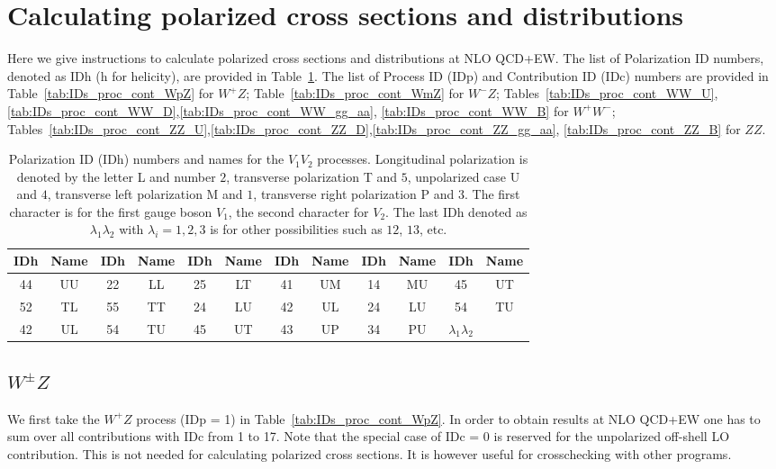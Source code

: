 \documentclass[english,12pt]{article}
\newcommand{\tab}[1]{Table~\ref{#1}}
\begin{document}
\section{Calculating polarized cross sections and distributions}
\label{sec:cal_pol_xs}
Here we give instructions to calculate polarized cross sections and distributions at NLO QCD+EW.
The list of Polarization ID numbers, denoted as IDh (h for helicity), are provided in \tab{tab:IDs_polars}. 
The list of Process ID (IDp) and Contribution ID (IDc) numbers are provided in 
\tab{tab:IDs_proc_cont_WpZ} for $W^+Z$; 
\tab{tab:IDs_proc_cont_WmZ} for $W^-Z$;
Tables~\ref{tab:IDs_proc_cont_WW_U},\ref{tab:IDs_proc_cont_WW_D},\ref{tab:IDs_proc_cont_WW_gg_aa}, 
\ref{tab:IDs_proc_cont_WW_B} for $W^+W^-$;
Tables~\ref{tab:IDs_proc_cont_ZZ_U},\ref{tab:IDs_proc_cont_ZZ_D},\ref{tab:IDs_proc_cont_ZZ_gg_aa}, 
\ref{tab:IDs_proc_cont_ZZ_B} for $ZZ$.
\begin{table}[th!]
\begin{center}
\begin{tabular}{|cc|cc|cc|cc|cc|cc|}\hline
IDh  & Name & IDh & Name & IDh & Name & IDh & Name & IDh & Name & IDh & Name \\
\hline
44 & UU & 22 & LL & 25 & LT & 41 & UM & 14 & MU & 45 & UT \\
52 & TL & 55 & TT & 24 & LU & 42 & UL & 24 & LU & 54 & TU \\
42 & UL & 54 & TU & 45 & UT & 43 & UP & 34 & PU & $\lambda_1\lambda_2$ &  \\
\hline
\end{tabular}
\caption{\small Polarization ID (IDh) numbers and names for the $V_1V_2$ processes. Longitudinal polarization 
is denoted by the letter L and number $2$, transverse polarization T and $5$, unpolarized case U and $4$, 
transverse left polarization M and $1$, transverse right polarization P and $3$. 
The first character is for the first gauge boson $V_1$, the second character for $V_2$. 
The last IDh denoted as $\lambda_1\lambda_2$ with $\lambda_i = 1,2,3$ is for other possibilities such as $12$, $13$, etc.}
\label{tab:IDs_polars}
\end{center}
\end{table}
\subsection{$W^\pm Z$}
\label{sec:cal_xs_WZ}
We first take the $W^+Z$ process (IDp = 1) in \tab{tab:IDs_proc_cont_WpZ}.
In order to obtain results at NLO QCD+EW one has to sum over all contributions with IDc from 1 to 17. 
Note that the special case of IDc = 0 is reserved for the unpolarized off-shell LO contribution. 
This is not needed for calculating polarized cross sections. It is however useful for crosschecking with other programs.   
\end{document}

